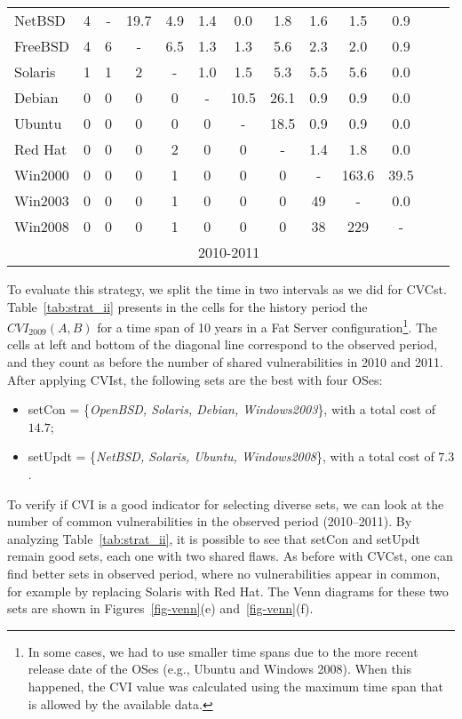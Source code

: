 \begin{table}[!ht]
\begin{center}
{\begin{tabular}{|l|c|c|c|c|c|c|c|c|c|c|c|c|}
NetBSD & 4 &  - & 19.7 & 4.9 & 1.4 & 0.0 & 1.8 & 1.6 & 1.5 & 0.9&\\ \cline{1-11}
FreeBSD & 4 & 6 & - & 6.5 & 1.3 & 1.3 & 5.6 & 2.3 & 2.0 & 0.9&\\ \cline{1-11}
Solaris & 1 & 1 & 2 & - & 1.0 & 1.5 & 5.3 & 5.5 & 5.6 & 0.0&\\ \cline{1-11}
Debian & 0 & 0 & 0 & 0 & - & 10.5 & 26.1 & 0.9 & 0.9 & 0.0&\\ \cline{1-11}
Ubuntu & 0 & 0 & 0 & 0 & 0 & - & 18.5 & 0.9 & 0.9 & 0.0&\\ \cline{1-11}
Red Hat & 0 & 0 & 0 & 2 & 0 & 0 &  - & 1.4 & 1.8 & 0.0&\\ \cline{1-11}
Win2000 & 0 & 0 & 0 & 1 & 0 & 0 & 0 & - & 163.6 & 39.5&\\ \cline{1-11}
Win2003 & 0 & 0 & 0 & 1 & 0 & 0 & 0 & 49 & - & 0.0 &\\ \cline{1-12}
Win2008 & 0 & 0 & 0 & 1 & 0 & 0 & 0 & 38 & 229 & - &\multicolumn{1}{|c}{}  \\ \cline{1-11}
 \multicolumn{1}{c|}{}& \multicolumn{9}{|c|}{2010-2011} & \multicolumn{2}{|c}{}\\ \cline{2-10}
\end{tabular}
}
\end{center}
\end{table}

To evaluate this strategy, we split the time in two intervals as we did for CVCst. Table~\ref{tab:strat_ii} presents in the cells for the history period the $\mathit{CVI}_{2009}(A,B)$ for a time span of 10 years in a Fat Server configuration\footnote{In some cases, we had to use smaller time spans due to the more recent release date of the OSes (e.g., Ubuntu and Windows 2008). When this happened, the CVI value was calculated using the maximum time span that is allowed by the available data.}. The cells at left and bottom of the diagonal line correspond to the observed period, and they count as before the number of shared vulnerabilities in 2010 and 2011. After applying CVIst, the following sets are the best with four OSes:

\begin{itemize}
\item setCon = \{\emph{OpenBSD, Solaris, Debian, Windows2003}\}, with a total cost of $14.7$;
\item setUpdt = \{\emph{NetBSD, Solaris, Ubuntu, Windows2008}\}, with a total cost of $7.3$.
\end{itemize}

To verify if CVI is a good indicator for selecting diverse sets, we can look at the number of common vulnerabilities in the observed period (2010--2011). By analyzing Table~\ref{tab:strat_ii}, it is possible to see that setCon and setUpdt remain good sets, each one with two shared flaws. As before with CVCst, one can find better sets in observed period, where no vulnerabilities appear in common, for example by replacing Solaris with Red Hat. The Venn diagrams for these two sets are shown in Figures~\ref{fig-venn}(e) and~\ref{fig-venn}(f).

